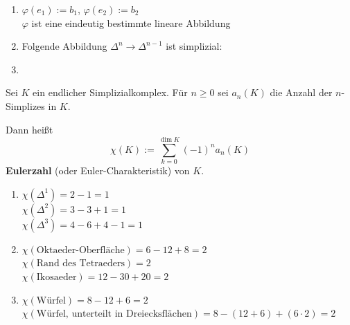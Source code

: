 \begin{beispiel}
    \begin{enumerate}[label=\arabic*)]
        \item $\varphi(e_1) := b_1$, $\varphi(e_2) := b_2$\\
              $\varphi$ ist eine eindeutig bestimmte lineare Abbildung

              

        \item Folgende Abbildung $\Delta^n \rightarrow \Delta^{n-1}$ 
              ist simplizial:

              
        \item {}

            
    \end{enumerate}
\end{beispiel}

\begin{definition}
    Sei $K$ ein endlicher Simplizialkomplex. Für $n \geq 0$ sei
    $a_n(K)$ die Anzahl der $n$-Simplizes in $K$.

    Dann heißt 
    \[\chi(K) := \sum_{k=0}^{\dim K} (-1)^n a_n(K)\]
    \textbf{Eulerzahl} (oder Euler-Charakteristik)
    von $K$.
\end{definition}

\begin{beispiel}
    \begin{enumerate}[label=\arabic*)]
        \item $\chi(\Delta^1) = 2 - 1 = 1$\\
              $\chi(\Delta^2) = 3 - 3 + 1 = 1$\\
              $\chi(\Delta^3) = 4 - 6 + 4 - 1 = 1$
        \item $\chi(\text{Oktaeder-Oberfläche}) = 6 - 12 + 8 = 2$\\
              $\chi(\text{Rand des Tetraeders}) = 2$\\
              $\chi(\text{Ikosaeder}) = 12 - 30 + 20 = 2$
        \item $\chi(\text{Würfel}) = 8 - 12 + 6 = 2$\\
              $\chi(\text{Würfel, unterteilt in Dreiecksflächen}) = 8 - (12 + 6) + (6 \cdot 2) = 2$
    \end{enumerate}
\end{beispiel}

